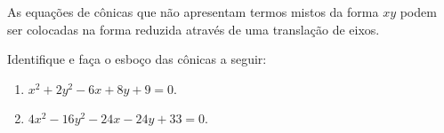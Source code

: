 \begin{frame}[label=conicas]

As equações de cônicas que não apresentam termos mistos da forma $xy$ 
podem  ser colocadas na forma reduzida através de uma translação de 
eixos.

\begin{exe}
Identifique e faça o esboço das cônicas a seguir:

\begin{enumerate}
\item $x^2+2y^2-6x+8y+9=0$.
\item $4x^2-16y^2-24x-24y+33=0$.
\end{enumerate}
\end{exe}

\end{frame}


